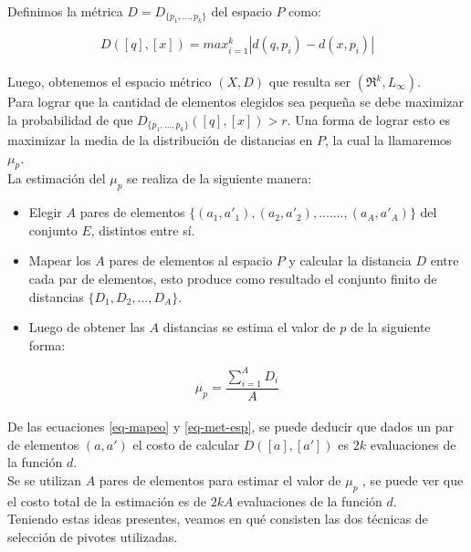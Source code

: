\noindent Definimos la m\'etrica $D = D_{\{p_1,...,p_k\}}$ del espacio $P$ como:

\begin{equation}
D([q],[x]) = max_{i=1}^k |d(q,p_i) - d(x,p_i)|
\label{eq-met-esp}
\end{equation}
\\

Luego, obtenemos el espacio m\'etrico $(X,D)$ que resulta ser $(\Re^k, L_{\infty})$. \\

Para lograr que la cantidad de elementos elegidos sea peque\~na se debe maximizar la probabilidad de que $D_{\{p_1,...,p_k\}}([q],[x]) > r$. Una forma de lograr esto es maximizar la media de la distribuci\'on de distancias en $P$, la cual la llamaremos $\mu_p$.\\
 

\noindent La estimaci\'on del $\mu_p$ se realiza de la siguiente manera:\\

\begin{itemize}
	\item Elegir $A$ pares de elementos $\{(a_1,a'_1),(a_2,a'_2),.......,(a_A,a'_A)\}$ del conjunto $E$, distintos entre s\'i.
	\item Mapear los $A$ pares de elementos al espacio $P$ y calcular la distancia $D$ entre cada par de elementos, esto produce como resultado el conjunto finito de distancias $\{D_1,D_2,...,D_A\}$.
	\item Luego de obtener las $A$ distancias se estima el valor de $p$ de la siguiente forma:
\end{itemize}

\begin{equation}
\mu_p = \frac{\sum_{i=1}^A D_i}{A}
\end{equation}
\\

De las ecuaciones \ref{eq-mapeo} y \ref{eq-met-esp}, se puede deducir que dados un par de elementos $(a,a')$ el costo de calcular $D([a],[a'])$ es $2k$ evaluaciones de la funci\'on $d$.\\

Se se utilizan $A$ pares de elementos para estimar el valor de $\mu_p$ , se puede ver que el costo total de la estimaci\'on es de $2kA$ evaluaciones de la funci\'on $d$.\\

Teniendo estas ideas presentes, veamos en qu\'e consisten las dos t\'ecnicas de selecci\'on de pivotes utilizadas.\\
 \\
 
